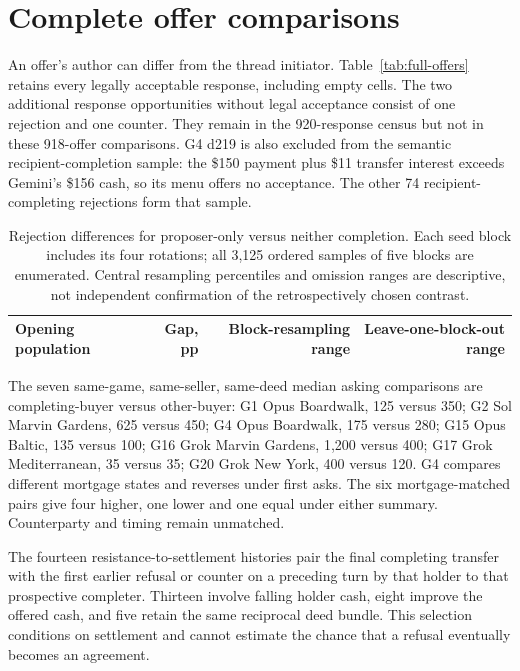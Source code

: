 \section{Complete offer comparisons}
\label{app:comparisons}
An offer's author can differ from the thread initiator. Table~\ref{tab:full-offers} retains every legally acceptable response, including empty cells. The two additional response opportunities without legal acceptance consist of one rejection and one counter. They remain in the 920-response census but not in these 918-offer comparisons.
G4 d219 is also excluded from the semantic recipient-completion sample: the \$150 payment plus \$11 transfer interest exceeds Gemini's \$156 cash, so its menu offers no acceptance. The other 74 recipient-completing rejections form that sample.


\begin{table}[ht]\centering\small
\begin{tabular}{@{}lrrr@{}}\toprule
Opening population & Gap, pp & Block-resampling range & Leave-one-block-out range\\\midrule

\end{tabular}
\caption{Rejection differences for proposer-only versus neither completion. Each seed block includes its four rotations; all 3,125 ordered samples of five blocks are enumerated. Central resampling percentiles and omission ranges are descriptive, not independent confirmation of the retrospectively chosen contrast.}
\end{table}

The seven same-game, same-seller, same-deed median asking comparisons are completing-buyer versus other-buyer: G1 Opus Boardwalk, 125 versus 350; G2 Sol Marvin Gardens, 625 versus 450; G4 Opus Boardwalk, 175 versus 280; G15 Opus Baltic, 135 versus 100; G16 Grok Marvin Gardens, 1,200 versus 400; G17 Grok Mediterranean, 35 versus 35; G20 Grok New York, 400 versus 120. G4 compares different mortgage states and reverses under first asks. The six mortgage-matched pairs give four higher, one lower and one equal under either summary. Counterparty and timing remain unmatched.

The fourteen resistance-to-settlement histories pair the final completing transfer with the first earlier refusal or counter on a preceding turn by that holder to that prospective completer. Thirteen involve falling holder cash, eight improve the offered cash, and five retain the same reciprocal deed bundle. This selection conditions on settlement and cannot estimate the chance that a refusal eventually becomes an agreement.

